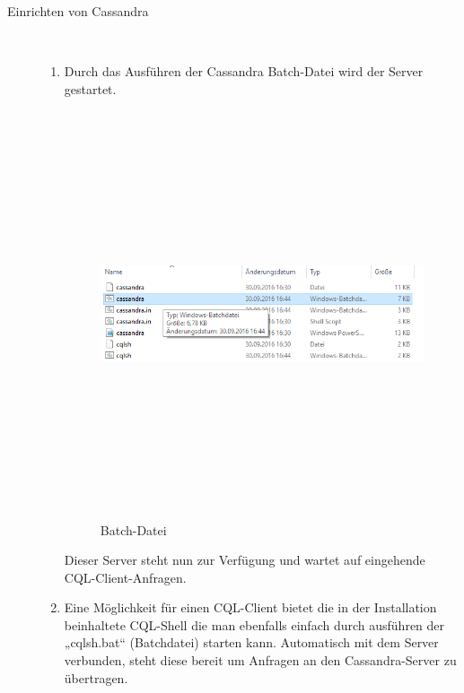 \documentclass[a4paper, 12pt]{scrartcl}
\begin{document}
\begin{description}
   \item[Einrichten von Cassandra]~\par
   \begin{enumerate}
      \item Durch das Ausführen der Cassandra Batch-Datei wird der Server gestartet.
      
\begin{figure}[H]
\centering
\includegraphics[height=12cm, width=15cm, keepaspectratio]{cass3.png}
\caption{Batch-Datei}
\end{figure}    
       
     
      Dieser Server steht nun zur Verfügung und wartet auf eingehende CQL-Client-Anfragen.
      \item Eine Möglichkeit für einen CQL-Client bietet die in der Installation beinhaltete CQL-Shell die man ebenfalls einfach durch ausführen der „cqlsh.bat“ (Batchdatei) starten kann. Automatisch mit dem Server verbunden, steht diese bereit um Anfragen an den Cassandra-Server zu übertragen. 


\end{enumerate}
\end{description}
\end{document}
